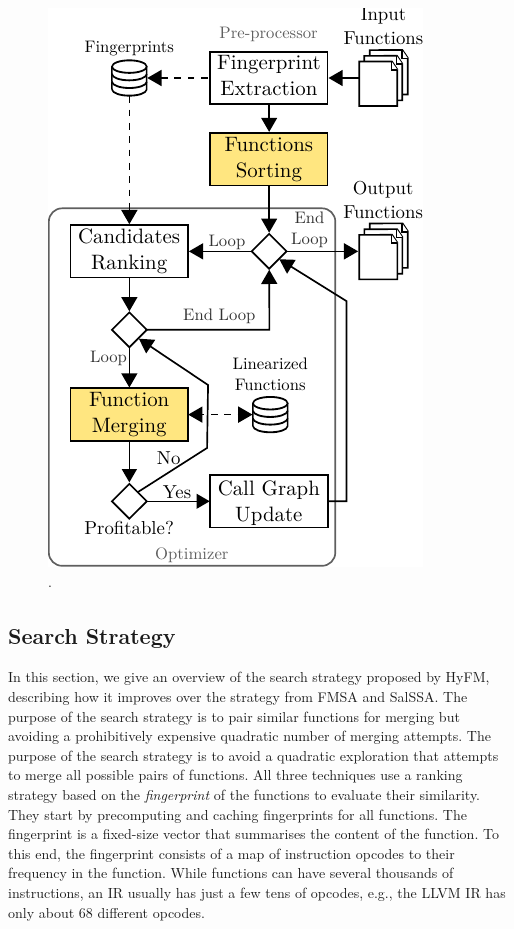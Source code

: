 \begin{figure}[h]
  \centering
  \includegraphics[scale=0.85]{src/fastfm/figs/func-merge-opt-arch.pdf}
  \caption{.}
  \label{fig:func-merge-opt-arch}
\end{figure}

\subsection{Search Strategy}

In this section, we give an overview of the search strategy proposed by HyFM, describing how it improves over the strategy from FMSA and SalSSA.
The purpose of the search strategy is to pair similar functions for merging but avoiding a prohibitively expensive quadratic number of merging attempts.
The purpose of the search strategy is to avoid a quadratic exploration that attempts to merge all possible pairs of functions.
All three techniques use a ranking strategy based on the \textit{fingerprint} of the functions to evaluate their similarity.
They start by precomputing and caching fingerprints for all functions.
The fingerprint is a fixed-size vector that summarises the content of the function.
To this end, the fingerprint consists of a map of instruction opcodes to their frequency in the function.
While functions can have several thousands of instructions, an IR usually has just a few tens of opcodes, e.g., the LLVM IR has only about 68 different opcodes.

